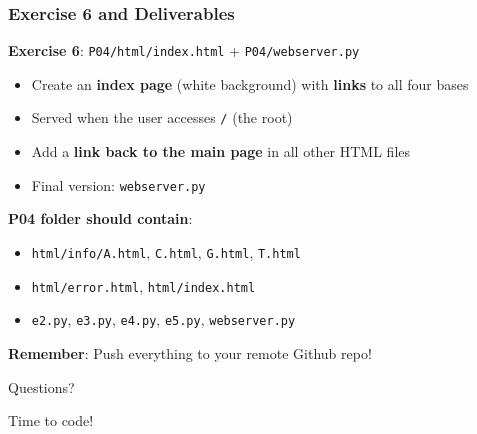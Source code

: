 \documentclass[xcolor=table]{beamer}
\begin{document}
\begin{frame}
\frametitle{Exercise 6 and Deliverables}

\textbf{Exercise 6}: \texttt{P04/html/index.html} + \texttt{P04/webserver.py}
\begin{itemize}
\item Create an \textbf{index page} (white background) with \textbf{links} to all four bases
\item Served when the user accesses \texttt{/} (the root)
\item Add a \textbf{link back to the main page} in all other HTML files
\item Final version: \texttt{webserver.py}
\end{itemize}

\vspace{0.3cm}

\textbf{P04 folder should contain}:

\begingroup\small
\begin{itemize}
\item \texttt{html/info/A.html}, \texttt{C.html}, \texttt{G.html}, \texttt{T.html}
\item \texttt{html/error.html}, \texttt{html/index.html}
\item \texttt{e2.py}, \texttt{e3.py}, \texttt{e4.py}, \texttt{e5.py}, \texttt{webserver.py}
\end{itemize}
\endgroup

\vspace{0.2cm}

\textbf{Remember}: Push everything to your remote Github repo!

\end{frame}


\begin{frame}
\begin{center}
\Huge{Questions?}

\vspace{1cm}

\Large{Time to code!}
\end{center}
\end{frame}
\end{document}
